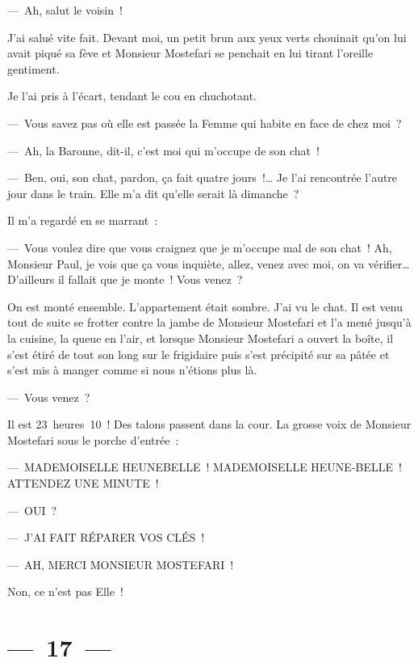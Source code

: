 \documentclass[french,twoside]{book} %
\begin{document}
— Ah, salut le voisin !\par
J’ai salué vite fait. Devant moi, un petit brun aux yeux verts chouinait qu’on lui avait piqué sa fève et Monsieur Mostefari se penchait en lui tirant l’oreille gentiment.\par
Je l’ai pris à l’écart, tendant le cou en chuchotant.\par
— Vous savez pas où elle est passée la Femme qui habite en face de chez moi ?\par
— Ah, la Baronne, dit-il, c’est moi qui m’occupe de son chat !\par
— Ben, oui, son chat, pardon, ça fait quatre jours !… Je l’ai rencontrée l’autre jour dans le train. Elle m’a dit qu’elle serait là dimanche ?\par
Il m’a regardé en se marrant :\par
— Vous voulez dire que vous craignez que je m’occupe mal de son chat ! Ah, Monsieur Paul, je vois que ça vous inquiète, allez, venez avec moi, on va vérifier… D’ailleurs il fallait que je monte ! Vous venez ?\par
On est monté ensemble. L’appartement était sombre. J’ai vu le chat. Il est venu tout de suite se frotter contre la jambe de Monsieur Mostefari et l’a mené jusqu’à la cuisine, la queue en l’air, et lorsque Monsieur Mostefari a ouvert la boîte, il s’est étiré de tout son long sur le frigidaire puis s’est précipité sur sa pâtée et s’est mis à manger comme si nous n’étions plus là.\par
— Vous venez ?\par
\bigbreak
\noindent Il est 23 heures 10 ! Des talons passent dans la cour. La grosse voix de Monsieur Mostefari sous le porche d’entrée :\par
— MADEMOISELLE HEUNEBELLE ! MADEMOISELLE HEUNE-BELLE ! ATTENDEZ UNE MINUTE !\par
— OUI ?\par
— J’AI FAIT RÉPARER VOS CLÉS !\par
— AH, MERCI MONSIEUR MOSTEFARI !\par
Non, ce n’est pas Elle !

\section[{— 17 —}]{— 17 —}
\renewcommand{\leftmark}{— 17 —}
\end{document}
